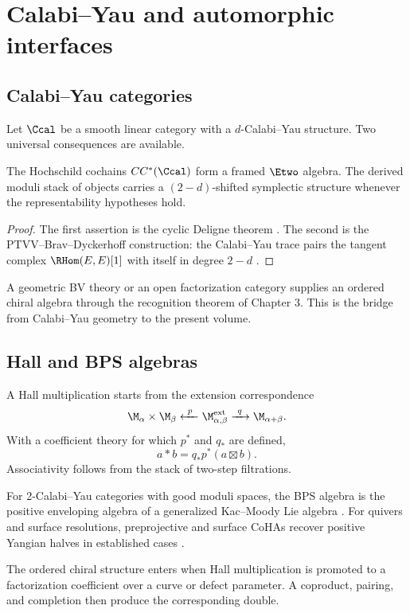 \part{Calabi--Yau and automorphic interfaces}

\chapter{Calabi--Yau categories}
Let $\Ccal$ be a smooth linear category with a $d$-Calabi--Yau structure. Two universal consequences are available.

\begin{theorem}
The Hochschild cochains $CC^*(\Ccal)$ form a framed $\Etwo$ algebra. The derived moduli stack of objects carries a $(2-d)$-shifted symplectic structure whenever the representability hypotheses hold.
\end{theorem}
\begin{proof}
The first assertion is the cyclic Deligne theorem \cite{BravRozenblyum}. The second is the PTVV--Brav--Dyckerhoff construction: the Calabi--Yau trace pairs the tangent complex $\RHom(E,E)[1]$ with itself in degree $2-d$ \cite{PTVV,BravDyckerhoff}.
\end{proof}

A geometric BV theory or an open factorization category supplies an ordered chiral algebra through the recognition theorem of Chapter 3. This is the bridge from Calabi--Yau geometry to the present volume.

\chapter{Hall and BPS algebras}
A Hall multiplication starts from the extension correspondence
\[
 \M_{\alpha}\times\M_{\beta}
 \xleftarrow{\ p\ }\M_{\alpha,\beta}^{\mathrm{ext}}
 \xrightarrow{\ q\ }\M_{\alpha+\beta}.
\]
With a coefficient theory for which $p^*$ and $q_*$ are defined,
\[
 a*b=q_*p^*(a\boxtimes b).
\]
Associativity follows from the stack of two-step filtrations.

For 2-Calabi--Yau categories with good moduli spaces, the BPS algebra is the positive enveloping algebra of a generalized Kac--Moody Lie algebra \cite{DHS}. For quivers and surface resolutions, preprojective and surface CoHAs recover positive Yangian halves in established cases \cite{SVYangians,DPPSSV}.

The ordered chiral structure enters when Hall multiplication is promoted to a factorization coefficient over a curve or defect parameter. A coproduct, pairing, and completion then produce the corresponding double.


